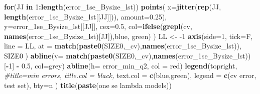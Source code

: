 \documentclass[
]{book}
\newenvironment{Shaded}{\begin{snugshade}}{\end{snugshade}}
\newcommand{\CommentTok}[1]{\textcolor[rgb]{0.56,0.35,0.01}{\textit{#1}}}
\newcommand{\ControlFlowTok}[1]{\textcolor[rgb]{0.13,0.29,0.53}{\textbf{#1}}}
\newcommand{\DataTypeTok}[1]{\textcolor[rgb]{0.13,0.29,0.53}{#1}}
\newcommand{\DecValTok}[1]{\textcolor[rgb]{0.00,0.00,0.81}{#1}}
\newcommand{\FloatTok}[1]{\textcolor[rgb]{0.00,0.00,0.81}{#1}}
\newcommand{\KeywordTok}[1]{\textcolor[rgb]{0.13,0.29,0.53}{\textbf{#1}}}
\newcommand{\NormalTok}[1]{#1}
\newcommand{\OperatorTok}[1]{\textcolor[rgb]{0.81,0.36,0.00}{\textbf{#1}}}
\newcommand{\StringTok}[1]{\textcolor[rgb]{0.31,0.60,0.02}{#1}}
\begin{document}
\begin{Shaded}
\begin{Highlighting}[]
\ControlFlowTok{for}\NormalTok{(JJ }\ControlFlowTok{in} \DecValTok{1}\OperatorTok{:}\KeywordTok{length}\NormalTok{(error\_1se\_Bysize\_lst))}
\KeywordTok{points}\NormalTok{(}
   \DataTypeTok{x=}\KeywordTok{jitter}\NormalTok{(}\KeywordTok{rep}\NormalTok{(JJ, }\KeywordTok{length}\NormalTok{(error\_1se\_Bysize\_lst[[JJ]])), }\DataTypeTok{amount=}\FloatTok{0.25}\NormalTok{), }
   \DataTypeTok{y=}\NormalTok{error\_1se\_Bysize\_lst[[JJ]], }\DataTypeTok{cex=}\FloatTok{0.5}\NormalTok{,}
   \DataTypeTok{col=}\KeywordTok{ifelse}\NormalTok{(}\KeywordTok{grepl}\NormalTok{(}\StringTok{\textquotesingle{}cv\textquotesingle{}}\NormalTok{, }\KeywordTok{names}\NormalTok{(error\_1se\_Bysize\_lst)[JJ]),}\StringTok{\textquotesingle{}blue\textquotesingle{}}\NormalTok{, }\StringTok{\textquotesingle{}green\textquotesingle{}}\NormalTok{)}
\NormalTok{)}
\NormalTok{LL <{-}}\StringTok{ }\DecValTok{{-}1}
\KeywordTok{axis}\NormalTok{(}\DataTypeTok{side=}\DecValTok{1}\NormalTok{, }\DataTypeTok{tick=}\NormalTok{F, }\DataTypeTok{line =}\NormalTok{ LL,}
  \DataTypeTok{at =} \KeywordTok{match}\NormalTok{(}\KeywordTok{paste0}\NormalTok{(SIZE0,}\StringTok{\textquotesingle{}\_cv\textquotesingle{}}\NormalTok{),}\KeywordTok{names}\NormalTok{(error\_1se\_Bysize\_lst)),}
\NormalTok{  SIZE0}
\NormalTok{ )}
\KeywordTok{abline}\NormalTok{(}\DataTypeTok{v=} \KeywordTok{match}\NormalTok{(}\KeywordTok{paste0}\NormalTok{(SIZE0,}\StringTok{\textquotesingle{}\_cv\textquotesingle{}}\NormalTok{),}\KeywordTok{names}\NormalTok{(error\_1se\_Bysize\_lst))[}\OperatorTok{{-}}\DecValTok{1}\NormalTok{] }\OperatorTok{{-}}\StringTok{ }\FloatTok{0.5}\NormalTok{, }\DataTypeTok{col=}\StringTok{\textquotesingle{}grey\textquotesingle{}}\NormalTok{)}
\KeywordTok{abline}\NormalTok{(}\DataTypeTok{h=}\NormalTok{ error\_min\_q2, }\DataTypeTok{col =} \StringTok{\textquotesingle{}red\textquotesingle{}}\NormalTok{)}
\KeywordTok{legend}\NormalTok{(}\StringTok{\textquotesingle{}topright\textquotesingle{}}\NormalTok{,}
   \CommentTok{\#title=\textquotesingle{}min errors\textquotesingle{}, title.col = \textquotesingle{}black\textquotesingle{},}
   \DataTypeTok{text.col =} \KeywordTok{c}\NormalTok{(}\StringTok{\textquotesingle{}blue\textquotesingle{}}\NormalTok{,}\StringTok{\textquotesingle{}green\textquotesingle{}}\NormalTok{),}
   \DataTypeTok{legend =} \KeywordTok{c}\NormalTok{(}\StringTok{\textquotesingle{}cv error\textquotesingle{}}\NormalTok{, }\StringTok{\textquotesingle{}test set\textquotesingle{}}\NormalTok{),}
   \DataTypeTok{bty=}\StringTok{\textquotesingle{}n\textquotesingle{}}
\NormalTok{ )}
\KeywordTok{title}\NormalTok{(}\KeywordTok{paste}\NormalTok{(}\StringTok{\textquotesingle{}one se lambda models\textquotesingle{}}\NormalTok{))}



\end{Highlighting}
\end{Shaded}
\end{document}
